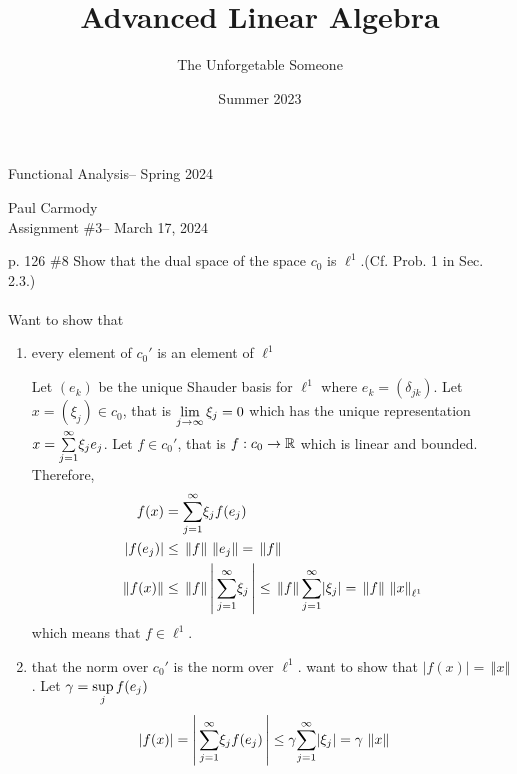 \documentclass[10pt,a4paper]{report}
\title{Advanced Linear Algebra}
\author{The Unforgetable Someone}
\date{Summer 2023}
\newcommand{\CLASSNAME}{Functional Analysis}
\newcommand{\STUDENTNAME}{Paul Carmody}
\newcommand{\ASSIGNMENT}{Assignment \#3}
\newcommand{\DUEDATE}{March 17, 2024}
\newcommand{\SEMESTER}{Spring 2024}
\newcommand{\NORM}[1]{\,\left \Vert #1 \right \Vert}
\begin{document}
\begin{center}
	\Large{\CLASSNAME -- \SEMESTER} \\
\end{center}
\begin{center}
	\STUDENTNAME \\
	\ASSIGNMENT -- \DUEDATE\\
\end{center} 
p. 126 \#8 
Show that the dual space of the space $c_0$ is $\ell^1$.(Cf. Prob. 1 in Sec. 2.3.)\\
\\
Want to show that
\begin{enumerate}
	\item every element of $c_0'$ is an element of $\ell^1$
	
	Let $(e_k)$ be the unique Shauder basis for $\ell^1$ where $e_k = (\delta_{jk})$.  Let $x = (\xi_j) \in c_0$, that is $\underset{j\to \infty}\lim\, \xi_j = 0$ which has the unique representation $x=\underset{j=1}{\overset{\infty}{\sum}} \xi_j e_j$. Let $f \in c_0'$, that is $f: c_0 \to \mathbb{R}$ which is linear and bounded.  Therefore, 
	\begin{align*}
		f(x) &= \SUM{j=1}{\infty} \xi_j f(e_j)\\
		|f(e_j)| &\le \NORM{f}\NORM{e_j} = \NORM{f} \\
		\NORM{f(x)} &\le \NORM{f} \BARS{\SUM{j=1}{\infty} \xi_j} \le \NORM{f} \SUM{j=1}{\infty} |\xi_j| = \NORM{f} \NORM{x}_{\ell^1}
	\end{align*}which means that $f \in \ell^1$.
	
	\item that the norm over $c_0'$ is the norm over $\ell^1$.  want to show that $|f(x)| = \NORM{x}$.  Let $\gamma = \underset{j}\sup \, f(e_j)$
	\begin{align*}
		|f(x)| &= \BARS{\SUM{j=1}{\infty} \xi_j f(e_j)} \le \gamma \SUM{j=1}{\infty} |\xi_j| = \gamma \NORM{x}
	\end{align*}
\end{enumerate}
\end{document}
